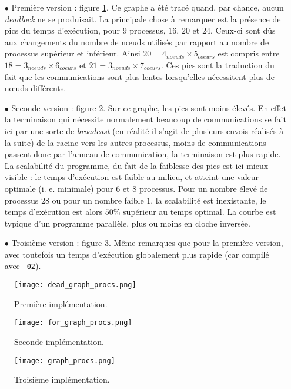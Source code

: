 \begin{itemize}
\item[$\bullet$] Première version : figure \ref{img:graph1}. Ce graphe a été tracé quand, par chance, aucun \emph{deadlock} ne se produisait. La principale chose à remarquer est la présence de pics du temps d'exécution, pour $9$ processus, $16$, $20$ et $24$. Ceux-ci sont dûs aux changements du nombre de n\oe uds utilisés par rapport au nombre de processus supérieur et inférieur. Ainsi $20 = 4_{noeuds} \times 5_{coeurs}$ est compris entre $18 = 3_{noeuds} \times 6_{coeurs}$ et $21 = 3_{noeuds} \times 7_{coeurs}$. Ces pics sont la traduction du fait que les communications sont plus lentes lorsqu'elles nécessitent plus de n\oe uds différents.
\item[$\bullet$] Seconde version : figure \ref{img:graph2}. Sur ce graphe, les pics sont moins élevés. En effet la terminaison qui nécessite normalement beaucoup de communications se fait ici par une sorte de \emph{broadcast} (en réalité il s'agit de plusieurs envois réalisés à la suite) de la racine vers les autres processus, moins de communications passent donc par l'anneau de communication, la terminaison est plus rapide. La scalabilité du programme, du fait de la faiblesse des pics est ici mieux visible : le temps d'exécution est faible au milieu, et atteint une valeur optimale (i. e. minimale) pour $6$ et $8$ processus. Pour un nombre élevé de processus $28$ ou pour un nombre faible $1$, la scalabilité est inexistante, le temps d'exécution est alors $50 \%$ supérieur au temps optimal. La courbe est typique d'un programme parallèle, plus ou moins en cloche inversée.
\item[$\bullet$] Troisième version : figure \ref{img:graph3}. Même remarques que pour la première version, avec toutefois un temps d'exécution globalement plus rapide (car compilé avec \texttt{-02}).
\end{itemize}


\begin{figure}
\raggedright
\texttt{[image: dead\_graph\_procs.png]}
\caption{Première implémentation.}
\label{img:graph1}
\end{figure}

\begin{figure}
\raggedright
\texttt{[image: for\_graph\_procs.png]}
\caption{Seconde implémentation.}
\label{img:graph2}
\end{figure}

\begin{figure}
\raggedright
\texttt{[image: graph\_procs.png]}
\caption{Troisième implémentation.}
\label{img:graph3}
\end{figure}
